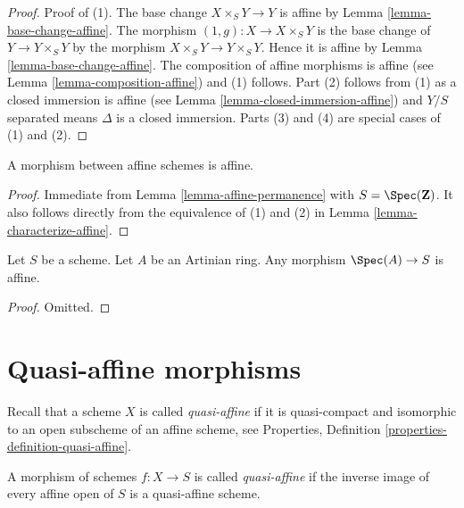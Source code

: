 \begin{proof}
Proof of (1). The base change $X \times_S Y \to Y$ is affine by
Lemma \ref{lemma-base-change-affine}.
The morphism $(1, g) : X \to X \times_S Y$ is the base change of
$Y \to Y \times_S Y$ by the morphism $X \times_S Y \to Y \times_S Y$.
Hence it is affine by
Lemma \ref{lemma-base-change-affine}.
The composition of affine morphisms is affine
(see Lemma \ref{lemma-composition-affine}) and (1) follows.
Part (2) follows from (1) as a closed immersion is affine
(see Lemma \ref{lemma-closed-immersion-affine}) and $Y/S$ separated
means $\Delta$ is a closed immersion. Parts (3) and (4) are special
cases of (1) and (2).
\end{proof}

\begin{lemma}
\label{lemma-morphism-affines-affine}
A morphism between affine schemes is affine.
\end{lemma}

\begin{proof}
Immediate from Lemma \ref{lemma-affine-permanence} with
$S = \Spec(\mathbf{Z})$. It also follows directly from the
equivalence of (1) and (2) in Lemma \ref{lemma-characterize-affine}.
\end{proof}

\begin{lemma}
\label{lemma-Artinian-affine}
Let $S$ be a scheme.
Let $A$ be an Artinian ring.
Any morphism $\Spec(A) \to S$ is affine.
\end{lemma}

\begin{proof}
Omitted.
\end{proof}









\section{Quasi-affine morphisms}
\label{section-quasi-affine}

\noindent
Recall that a scheme $X$ is called {\it quasi-affine} if it is quasi-compact
and isomorphic to an open subscheme of an affine scheme, see
Properties, Definition \ref{properties-definition-quasi-affine}.

\begin{definition}
\label{definition-quasi-affine}
A morphism of schemes $f : X \to S$ is called {\it quasi-affine} if the
inverse image of every affine open of $S$ is a quasi-affine scheme.
\end{definition}

